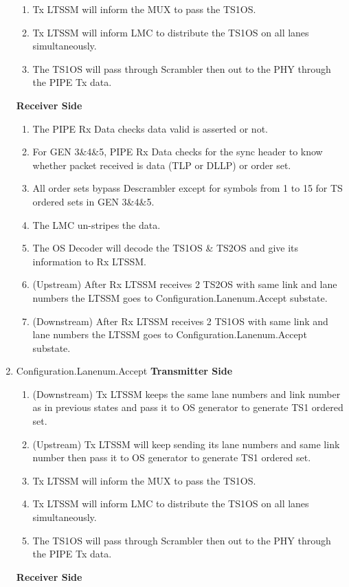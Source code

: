 \begin{enumerate}
\begin{enumerate}
  \item Tx LTSSM will inform the MUX to pass the TS1OS.
  \item Tx LTSSM will inform LMC to distribute the TS1OS on all lanes simultaneously.
  \item The TS1OS will pass through Scrambler then out to the PHY through the PIPE Tx data.
\end{enumerate}
\textbf{Receiver Side}
\begin{enumerate}
  \item The PIPE Rx Data checks data valid is asserted or not.
  \item For GEN 3\&4\&5, PIPE Rx Data checks for the sync header to know whether packet received is data (TLP or DLLP) or order set.
  \item All order sets bypass Descrambler except for symbols from 1 to 15 for TS ordered sets in GEN 3\&4\&5.
  \item The LMC un-stripes the data.
  \item The OS Decoder will decode the TS1OS \& TS2OS and give its information to Rx LTSSM.
  \item (Upstream) After Rx LTSSM receives 2 TS2OS with same link and lane numbers the LTSSM goes to Configuration.Lanenum.Accept substate.
  \item (Downstream) After Rx LTSSM receives 2 TS1OS with same link and lane numbers the LTSSM goes to Configuration.Lanenum.Accept substate.
\end{enumerate}
\item Configuration.Lanenum.Accept
\newline\textbf{Transmitter Side}
\begin{enumerate}
  \item (Downstream) Tx LTSSM keeps the same lane numbers and link number as in previous states and pass it to OS generator to generate TS1 ordered set.
  \item (Upstream) Tx LTSSM will keep sending its lane numbers and same link number then pass it to OS generator to generate TS1 ordered set.
  \item Tx LTSSM will inform the MUX to pass the TS1OS.
  \item Tx LTSSM will inform LMC to distribute the TS1OS on all lanes simultaneously.
  \item The TS1OS will pass through Scrambler then out to the PHY through the PIPE Tx data.
\end{enumerate}
\textbf{Receiver Side}
\begin{enumerate}

\end{enumerate}
\end{enumerate}
